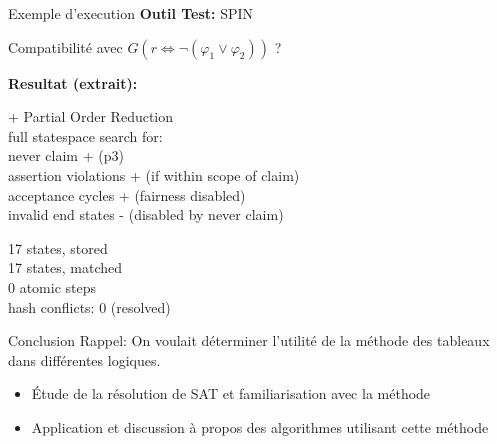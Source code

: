 \documentclass{beamer}
\theoremstyle{definition}
\begin{document}
\begin{frame}{Exemple d'execution}
    \textbf{Outil Test:} SPIN
    
    Compatibilité avec $G(r \Leftrightarrow \lnot(\varphi_1\lor\varphi_2))$ ?
    \vspace{10px}

    \textbf{Resultat (extrait):}

    + Partial Order Reduction\\
    full statespace search for:\\
    never claim + (p3)\\
    assertion violations + (if within scope of claim)\\
    acceptance cycles + (fairness disabled)\\
    invalid end states - (disabled by never claim)\\
    \vspace{5px}

    17 states, stored\\
    17 states, matched\\
    0 atomic steps\\
    hash conflicts: 0 (resolved)
\end{frame}

\begin{frame}{Conclusion}
    Rappel: On voulait déterminer l'utilité de la méthode des tableaux dans différentes logiques.
    \begin{itemize}
        \item Étude de la résolution de SAT et familiarisation avec la méthode 
        \item Application et discussion à propos des algorithmes utilisant cette méthode
    \end{itemize}
\end{frame}

\inputminted[]{ocaml}{Code/Alternee_Tableau.ml}
\inputminted[]{python}{Code/PropGenerator.py}
\inputminted[]{ocaml}{Code/quine.ml}
\inputminted[]{promela}{Code/modulo4.pml}
\end{document}
